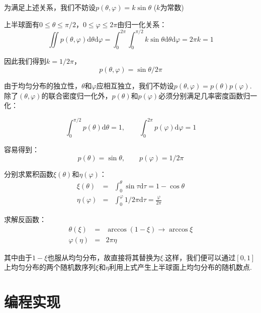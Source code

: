 \documentclass[12pt,a4paper,utf8]{ctexart}
\begin{document}
为满足上述关系，我们不妨设$p(\theta, \varphi) = k \sin \theta $ ($k$为常数)

上半球面有$0 \leq \theta \leq \pi /2$，$0 \leq \varphi
\leq 2\pi$由归一化关系：
\begin{equation}
    \iint p(\theta, \varphi) \textrm{d} \theta \textrm{d} \varphi = \int_0 ^{2
    \pi} \int _0 ^{\pi / 2} k \sin \theta \textrm{d} \theta \textrm{d} \varphi =
   2\pi k =1
\end{equation}

因此我们得到$k=1/2\pi$，
\begin{equation}
p(\theta, \varphi)=\sin \theta / 2\pi
\end{equation}

由于均匀分布的独立性，$\theta$和$\varphi$应相互独立，我们不妨设$p(\theta,
\varphi)=p(\theta)p(\varphi)$. 除了$(\theta,
\varphi)$的联合密度归一化外，$p(\theta)$和$p(\varphi)$必须分别满足几率密度函数归一化：

\begin{equation}
    \int _0 ^{\pi /2} p(\theta) \textrm{d} \theta = 1 , \qquad \int _0 ^{2\pi} p(\varphi) \textrm{d} \varphi = 1 
\end{equation}

容易得到：
\begin{equation}
    p(\theta)=\sin \theta , \qquad p(\varphi)=1/2\pi
\end{equation}

分别求累积函数$\xi(\theta)$和$\eta(\varphi)$：
\begin{eqnarray}
    \xi(\theta) &=& \int _0 ^{\theta} \sin \tau \textrm{d} \tau = 1 - \cos
    \theta \\
    \eta(\varphi) &=& \int _0 ^{\varphi} 1/2\pi \textrm{d} \tau =
    \frac{\varphi}{2\pi}
\end{eqnarray}

求解反函数：
\begin{eqnarray}
    \theta(\xi) &=& \arccos (1 - \xi) \rightarrow \arccos \xi \\
    \varphi(\eta) &=& 2\pi \eta
\end{eqnarray}

其中由于$1- \xi$也服从均匀分布，故直接将其替换为$\xi$.这样，我们便可以通过$[0,1]$上均匀分布的两个随机数序列$\xi$和$\eta$利用上式产生上半球面上均匀分布的随机数点.

\section{编程实现}
\end{document}
